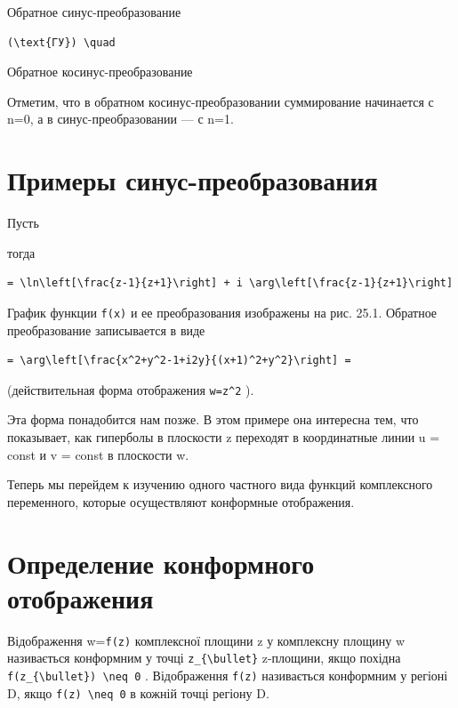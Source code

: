 \documentclass[
  ukrainian,
]{article}
\begin{document}
Обратное синус-преобразование

\begin{verbatim}
(\text{ГУ}) \quad
\end{verbatim}

Обратное косинус-преобразование

Отметим, что в обратном косинус-преобразовании суммирование начинается с
n=0, а в синус-преобразовании --- с n=1.

\section{Примеры
синус-преобразования}\label{ux43fux440ux438ux43cux435ux440ux44b-ux441ux438ux43dux443ux441-ux43fux440ux435ux43eux431ux440ux430ux437ux43eux432ux430ux43dux438ux44f}

Пусть

тогда

\begin{verbatim}
= \ln\left[\frac{z-1}{z+1}\right] + i \arg\left[\frac{z-1}{z+1}\right]
\end{verbatim}

График функции \texttt{f(x)} и ее преобразования изображены на рис.
25.1. Обратное преобразование записывается в виде

\begin{verbatim}
= \arg\left[\frac{x^2+y^2-1+i2y}{(x+1)^2+y^2}\right] =
\end{verbatim}

(действительная форма отображения \texttt{w=z\^{}2} ).

Эта форма понадобится нам позже. В этом примере она интересна тем, что
показывает, как гиперболы в плоскости z переходят в координатные линии u
= const и v = const в плоскости w.

Теперь мы перейдем к изучению одного частного вида функций комплексного
переменного, которые осуществляют конформные отображения.

\section{Определение конформного
отображения}\label{ux43eux43fux440ux435ux434ux435ux43bux435ux43dux438ux435-ux43aux43eux43dux444ux43eux440ux43cux43dux43eux433ux43e-ux43eux442ux43eux431ux440ux430ux436ux435ux43dux438ux44f-1}

Відображення w=\texttt{f(z)} комплексної площини z у комплексну площину
w називається конформним у точці \texttt{z\_\{\textbackslash{}bullet\}}
z-площини, якщо похідна
\texttt{f\textquotesingle{}(z\_\{\textbackslash{}bullet\})\ \textbackslash{}neq\ 0}
. Відображення \texttt{f(z)} називається конформним у регіоні D, якщо
\texttt{f\textquotesingle{}(z)\ \textbackslash{}neq\ 0} в кожній точці
регіону D.
\end{document}
